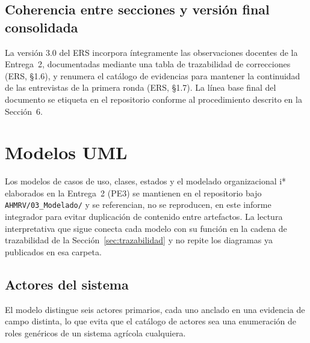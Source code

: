 \documentclass[11pt,a4paper]{article}
\newcommand{\id}[1]{\texttt{#1}}
\begin{document}
\subsection{Coherencia entre secciones y versión final consolidada}

La versión 3.0 del ERS incorpora íntegramente las observaciones docentes de la Entrega~2,
documentadas mediante una tabla de trazabilidad de correcciones (ERS, §1.6), y renumera el
catálogo de evidencias para mantener la continuidad de las entrevistas de la primera ronda (ERS,
§1.7). La línea base final del documento se etiqueta en el repositorio conforme al procedimiento
descrito en la Sección~6.

\begin{center}
\end{center}

\section{Modelos UML}
\label{sec:uml}

Los modelos de casos de uso, clases, estados y el modelado organizacional i* elaborados en la
Entrega~2 (PE3) se mantienen en el repositorio bajo \id{AHMRV/03\_Modelado/} y se referencian, no se
reproducen, en este informe integrador para evitar duplicación de contenido entre artefactos. La
lectura interpretativa que sigue conecta cada modelo con su función en la cadena de trazabilidad de
la Sección~\ref{sec:trazabilidad} y no repite los diagramas ya publicados en esa carpeta.

\subsection{Actores del sistema}

El modelo distingue seis actores primarios, cada uno anclado en una evidencia de campo distinta, lo
que evita que el catálogo de actores sea una enumeración de roles genéricos de un sistema agrícola
cualquiera.
\end{document}
